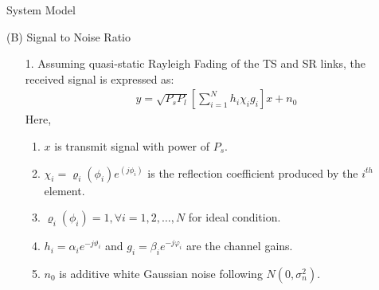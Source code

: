 \documentclass{beamer}
\begin{document}
\begin{frame}{System Model}
    \begin{block}{(B) Signal to Noise Ratio}
        \begin{enumerate}
            \item[1.] Assuming quasi-static Rayleigh Fading of the TS and SR links, the received signal is expressed as: 
                \begin{align}
                    y = \sqrt{P_s P_l}\left[\sum_{i=1}^{N} h_i \chi_i g_i\right]x + n_0
                \end{align}
                Here, 
                \begin{enumerate}
                    \item $x$ is transmit signal with power of $P_s$.
                    \item $\chi_i = \varrho_i(\phi_i)e^ {(j \phi_i)}$ is the reflection coefficient produced by the $i^{th}$ element.
                    \item $\varrho_i(\phi_i) = 1, \forall i = 1,2,\dots,N$ for ideal condition.
                    \item $h_i = \alpha_ie^{-j\vartheta_i}$ and $g_i = \beta_ie^{-j\varphi_i}$ are the channel gains.
                    \item $n_0$ is additive white Gaussian noise following $N(0,\sigma^2_n)$.
                \end{enumerate}
        \end{enumerate}
    \end{block}
\end{frame}
\end{document}
